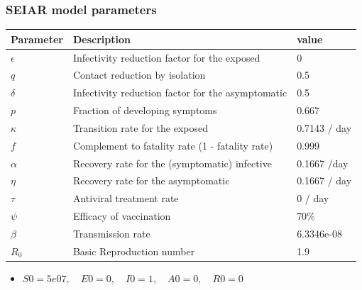 \documentclass[usenames,dvipsnames, aspectratio=169, 9pt]{beamer}
\begin{document}
\begin{frame}\frametitle{SEIAR model parameters}
\begin{table}[]
\begin{tabular}{lll}
\hline
Parameter & Description                                       & value        \\ \hline
$\epsilon$   & Infectivity reduction factor for the exposed      & 0            \\
$q$         & Contact reduction by isolation                    & 0.5          \\
$\delta$     & Infectivity reduction factor for the asymptomatic & 0.5          \\
$p$         & Fraction of developing symptoms                   & 0.667        \\
$\kappa$     & Transition rate for the exposed                   & 0.7143 / day \\
$f$         & Complement to fatality rate (1 - fatality rate)   & 0.999        \\
$\alpha$     & Recovery rate for the (symptomatic) infective     & 0.1667 /day  \\
$\eta$       & Recovery rate for the asymptomatic                & 0.1667 / day \\
$\tau$       & Antiviral treatment rate                          & 0 / day      \\
$\psi$       & Efficacy of vaccination                           & 70\%         \\ 
$\beta$    & Transmission rate                                 & 6.3346e-08           \\
$R_{0}$     & Basic Reproduction number                         & 1.9           \\\hline
\end{tabular}
\end{table}
\begin{itemize}
    \item $S0 = 5e07, \quad E0 = 0, \quad   I0 = 1,   \quad  A0 = 0,  \quad   R0 = 0$
\end{itemize}
\end{frame}
\end{document}
